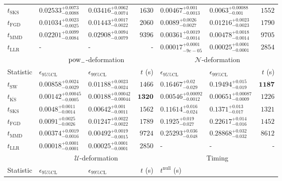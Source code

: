 \begin{tabular}{l|llr|llr}
	$t_{\mathrm{SKS}}$ & $0.02533_{-0.0088}^{+0.0073}$ & $0.03416_{-0.0074}^{+0.0062}$ & $1630$ & $0.00467_{-0.0013}^{+0.001}$ & $0.0063_{-0.001}^{+0.00088}$ & $1552$ \\
	$t_{\mathrm{FGD}}$ & ${\mathbf{0.01034_{-0.0025}^{+0.0023}}}$ & ${\mathbf{0.01443_{-0.0022}^{+0.0017}}}$ & $2060$ & $0.0089_{-0.0027}^{+0.0026}$ & $0.01216_{-0.0023}^{+0.0023}$ & $1790$ \\
	$t_{\mathrm{MMD}}$ & $0.02201_{-0.0084}^{+0.0099}$ & $0.02908_{-0.0079}^{+0.0094}$ & $9396$ & $0.00361_{-0.0014}^{+0.0019}$ & $0.00478_{-0.0014}^{+0.0018}$ & $9705$ \\
	$t_{\mathrm{LLR}}$ & - & - & - & $0.00017_{-9e-05}^{+0.0001}$ & $0.00025_{-0.0001}^{+0.0001}$ & $2854$ \\
	\toprule
	\multicolumn{1}{c}{} & \multicolumn{3}{c}{$\rm{pow}_{-}$-deformation} & \multicolumn{3}{c}{$\mathcal{N}$-deformation} \\
	Statistic & $\epsilon_{95\%\mathrm{CL}}$ & $\epsilon_{99\%\mathrm{CL}}$ & $t$ (s) & $\epsilon_{95\%\mathrm{CL}}$ & $\epsilon_{99\%\mathrm{CL}}$ & $t$ (s) \\
	\midrule
	$t_{\mathrm{SW}}$ & $0.00858_{-0.0029}^{+0.0024}$ & $0.01188_{-0.0024}^{+0.0023}$ & $1466$ & $0.16467_{-0.029}^{+0.02}$ & $0.19494_{-0.019}^{+0.015}$ & ${\mathbf{1187}}$ \\
	$t_{\overline{\mathrm{KS}}}$ & ${\mathbf{0.00142_{-0.0005}^{+0.00045}}}$ & ${\mathbf{0.00188_{-0.00044}^{+0.00042}}}$ & ${\mathbf{1320}}$ & ${\mathbf{0.00546_{-0.0012}^{+0.00092}}}$ & ${\mathbf{0.00651_{-0.0009}^{+0.00087}}}$ & $1226$ \\
	$t_{\mathrm{SKS}}$ & $0.0048_{-0.0014}^{+0.0011}$ & $0.00642_{-0.0011}^{+0.001}$ & $1562$ & $0.11614_{-0.024}^{+0.016}$ & $0.1371_{-0.017}^{+0.013}$ & $1321$ \\
	$t_{\mathrm{FGD}}$ & $0.0091_{-0.0026}^{+0.0025}$ & $0.01247_{-0.0022}^{+0.0022}$ & $1789$ & $0.1925_{-0.027}^{+0.019}$ & $0.22617_{-0.016}^{+0.014}$ & $1452$ \\
	$t_{\mathrm{MMD}}$ & $0.00374_{-0.0016}^{+0.0019}$ & $0.00492_{-0.0015}^{+0.0019}$ & $9724$ & $0.25293_{-0.048}^{+0.036}$ & $0.28868_{-0.032}^{+0.032}$ & $8612$ \\
	$t_{\mathrm{LLR}}$ & $0.00018_{-0.0001}^{+0.0001}$ & $0.00025_{-0.0001}^{+0.0001}$ & $2850$ & - & - & - \\
	\toprule
	\multicolumn{1}{c}{} & \multicolumn{3}{c}{$\mathcal{U}$-deformation} & \multicolumn{3}{c}{Timing} \\
	Statistic & $\epsilon_{95\%\mathrm{CL}}$ & $\epsilon_{99\%\mathrm{CL}}$ & $t$ (s) & $t^{\mathrm{null}}$ (s) \\

\end{tabular}
